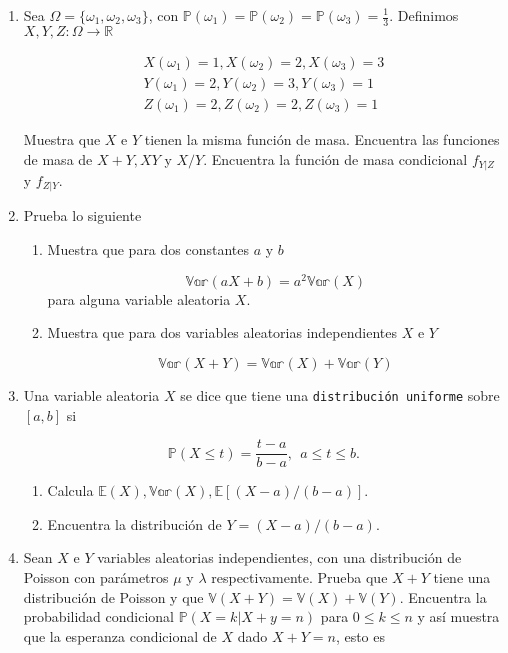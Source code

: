 \documentclass[a4paper,11pt]{report}
\begin{document}
\begin{enumerate}
\[
\mathbb{P}(X = k) = \mathbb{P}(Y = k) = pq^k \ \ \text{para}\ \ k =0,1,2,\dots
\]
donde $0 < p = 1 -q < 1$. Muestra que

\[
\mathbb{P}(X =k|X +Y = n) = \dfrac{1}{n +1}\ \ \text{para}\ \ k = 0,1, 2, \dots, n.
\]

\item Sea $\Omega = \{\omega_1, \omega_2, \omega_3 \}$, con $\mathbb{P}(\omega_1) = \mathbb{P}(\omega_2) = \mathbb{P}(\omega_3) = \frac{1}{3}$. Definimos $X, Y, Z: \Omega \rightarrow \mathbb{R}$

\begin{align*}
X(\omega_1)=1,   X(\omega_2)=2,  X(\omega_3)=3 \\
Y(\omega_1)=2,   Y(\omega_2)=3,  Y(\omega_3)=1 \\
Z(\omega_1)=2,   Z(\omega_2)=2,  Z(\omega_3)=1
\end{align*}

Muestra que $X$ e $Y$ tienen la misma funci\'on de masa. Encuentra las funciones de masa de $X +Y, XY $ y $X/Y$. Encuentra la funci\'on de masa condicional $f_{Y|Z}$ y $f_{Z|Y}$.
\item Prueba lo siguiente

\begin{enumerate}
	\item Muestra que para dos constantes $a$ y $b$
	
	\[
	\mathbb{Var}(aX + b) = a^2\mathbb{Var}(X)
	\]
para alguna variable aleatoria $X$.
\item Muestra que para dos variables aleatorias independientes $X$ e $Y$

\[
\mathbb{Var}(X + Y) = \mathbb{Var}(X) + \mathbb{Var}(Y)
\]
\end{enumerate}
\item Una variable aleatoria $X$ se dice que tiene una \texttt{distribuci\'on uniforme} sobre $[a, b]$ si

\[
\mathbb{P}(X \leq t) = \dfrac{t -a}{b -a}, \ \ a \leq t \leq b.
\]

\begin{enumerate}
	\item Calcula $\mathbb{E}(X), \mathbb{Var}(X), \mathbb{E}[(X -a)/(b -a)]$.
	\item Encuentra la distribuci\'on  de $Y = (X- a)/(b -a)$. 
\end{enumerate}

\item Sean $X$ e $Y$ variables aleatorias independientes, con una distribuci\'on de Poisson con par\'ametros $\mu$ y $\lambda$ respectivamente. Prueba que $X +Y$ tiene una distribuci\'on de Poisson y que $\mathbb{V}(X + Y) = \mathbb{V}(X) + \mathbb{V}(Y)$. Encuentra la probabilidad condicional $\mathbb{P}(X= k| X+y = n)$ para $0 \leq k \leq n$ y as\'i muestra que la esperanza condicional de $X$ dado $X +Y = n$, esto es


\end{enumerate}
\end{document}
